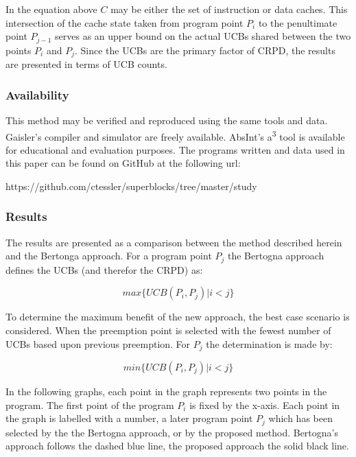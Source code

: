 In the equation above ${C}$ may be either the set of instruction or
data caches. This intersection of the cache state taken from program
point ${P_i}$ to the penultimate point ${P_{j-1}}$ serves as an upper
bound on the actual UCBs shared between the two points ${P_i}$ and
${P_j}$. Since the UCBs are the primary factor of CRPD, the results
are presented in terms of UCB counts.

\subsubsection{Availability}

This method may be verified and reproduced using the same tools and
data. Gaisler's compiler and simulator are freely available. AbsInt's
a\textsuperscript{3} tool is available for educational and evaluation
purposes. The programs written and data used in this paper can be
found on GitHub at the following url:

\begin{center}
https://github.com/ctessler/superblocks/tree/master/study
\end{center}


\subsubsection{Results}

The results are presented as a comparison between the method described
herein and the Bertonga approach. For a program point ${P_j}$ the
Bertogna approach defines the UCBs (and therefor the CRPD) as:

\begin{equation*}
  max\{ UCB(P_i, P_j) \vert i < j \}
\end{equation*}

To determine the maximum benefit of the new approach, the best case
scenario is considered. When the preemption point is selected with the
fewest number of UCBs based upon previous preemption.  For ${P_j}$ the
determination is made by:

\begin{equation*}
  min\{ UCB(P_i, P_j) \vert i < j \}
\end{equation*}


In the following graphs, each point in the graph represents two points
in the program. The first point of the program ${P_i}$ is fixed by the
x-axis. Each point in the graph is labelled with a number, a later
program point ${P_j}$ which has been selected by the the Bertogna
approach, or by the proposed method. Bertogna's approach follows the
dashed blue line, the proposed approach the solid black line.

